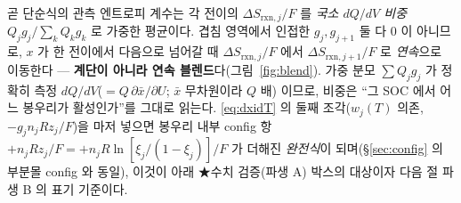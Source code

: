 \documentclass[11pt,a4paper]{article}
\newcommand{\rxn}{\mathrm{rxn}}
\begin{document}
곧 단순식의 관측 엔트로피 계수는 각 전이의 $\Delta S_{\rxn,j}/F$ 를 \emph{국소 $dQ/dV$ 비중}
$Q_jg_j/\sum_k Q_kg_k$ 로 가중한 평균이다. 겹침 영역에서 인접한 $g_j,g_{j+1}$ 둘 다 0 이 아니므로, $x$ 가 한
전이에서 다음으로 넘어갈 때 $\Delta S_{\rxn,j}/F$ 에서 $\Delta S_{\rxn,j+1}/F$ 로 \emph{연속}으로 이동한다 —
\textbf{계단이 아니라 연속 블렌드}다(그림~\ref{fig:blend}). 가중 분모 $\sum Q_jg_j$ 가 정확히 측정
$dQ/dV$($=Q\,\partial\bar x/\partial U$; $\bar x$ 무차원이라 $Q$ 배)
이므로, 비중은 ``그 SOC 에서 어느 봉우리가 활성인가''를 그대로 읽는다. \eqref{eq:dxidT} 의 둘째 조각($w_j(T)$
의존, $-g_jn_jRz_j/F$)을 마저 넣으면 봉우리 내부 config 항 $+n_jR z_j/F=+n_jR\ln[\xi_j/(1-\xi_j)]/F$ 가 더해진
\emph{완전식}이 되며(\S\ref{sec:config} 의 부분몰 config 와 동일), 이것이 아래 ★수치 검증(파생 A)
박스의 대상이자 다음 절 파생 B 의 표기 기준이다.
\end{document}
